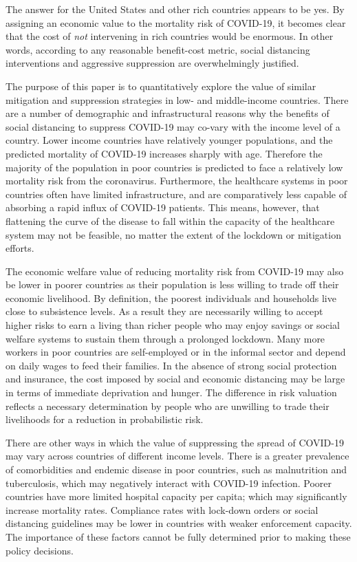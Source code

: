\documentclass[11pt]{article}
\begin{document}
The answer for the United States and other rich countries appears to be yes. By assigning an economic value to the mortality risk of COVID-19, it becomes clear that the cost of \textit{not} intervening in rich countries would be enormous. In other words, according to any reasonable benefit-cost metric, social distancing interventions and aggressive suppression are overwhelmingly justified.

The purpose of this paper is to quantitatively explore the value of similar mitigation and suppression strategies in low- and middle-income countries. There are a number of demographic and infrastructural reasons why the benefits of social distancing to suppress COVID-19 may co-vary with the income level of a country. Lower income countries have relatively younger populations, and the predicted mortality of COVID-19 increases sharply with age. Therefore the majority of the population in poor countries is predicted to face a relatively low mortality risk from the coronavirus. Furthermore, the healthcare systems in poor countries often have limited infrastructure, and are comparatively less capable of absorbing a rapid influx of COVID-19 patients. This means, however, that flattening the curve of the disease to fall within the capacity of the healthcare system may not be feasible, no matter the extent of the lockdown or mitigation efforts. 

The economic welfare value of reducing mortality risk from COVID-19 may also be lower in poorer countries as their population is less willing to trade off their economic livelihood. By definition, the poorest individuals and households live close to subsistence levels. As a result they are necessarily willing to accept higher risks to earn a living than richer people who may enjoy savings or social welfare systems to sustain them through a prolonged lockdown. Many more workers in poor countries are self-employed or in the informal sector and depend on daily wages to feed their families. In the absence of strong social protection and insurance, the cost imposed by social and economic distancing may be large in terms of immediate deprivation and hunger. The difference in risk valuation reflects a necessary determination by people who are unwilling to trade their livelihoods for a reduction in probabilistic risk.

There are other ways in which the value of suppressing the spread of COVID-19 may vary across countries of different income levels. There is a greater prevalence of comorbidities and endemic disease in poor countries, such as malnutrition and tuberculosis, which may negatively interact with COVID-19 infection. Poorer countries have more limited hospital capacity per capita; which may significantly increase mortality rates. Compliance rates with lock-down orders or social distancing guidelines may be lower in countries with weaker enforcement capacity. The importance of these factors cannot be fully determined prior to making these policy decisions. 
\end{document}
